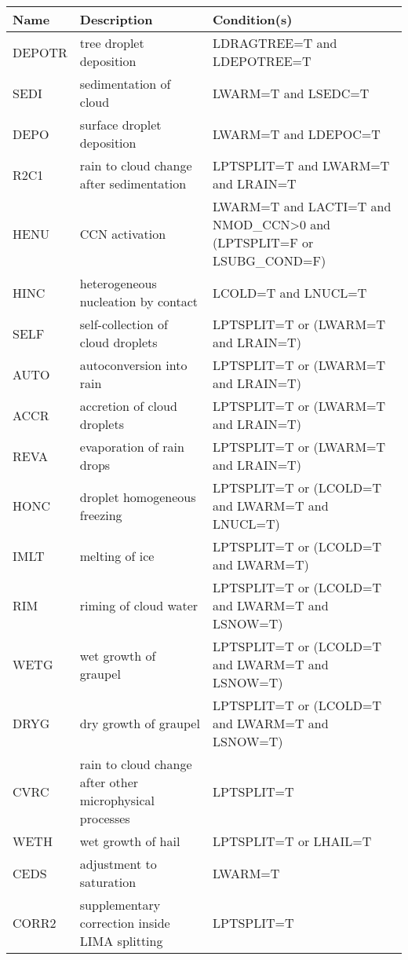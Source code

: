 \begin{longtable} {|p{}|p{}|p{}|}
\hline
Name & Description & Condition(s) \\
\hline \hline
\endhead
DEPOTR & tree droplet deposition                                  & LDRAGTREE=T and LDEPOTREE=T \\\hline
SEDI   & sedimentation of cloud                                   & LWARM=T and LSEDC=T \\\hline
DEPO   & surface droplet deposition                               & LWARM=T and LDEPOC=T \\\hline
R2C1   & rain to cloud change after sedimentation                 & LPTSPLIT=T and LWARM=T and LRAIN=T \\\hline
HENU   & CCN activation                                           & LWARM=T and LACTI=T and NMOD\_CCN>0 and (LPTSPLIT=F or LSUBG\_COND=F) \\\hline
HINC   & heterogeneous nucleation by contact                      & LCOLD=T and LNUCL=T \\\hline
SELF   & self-collection of cloud droplets                        & LPTSPLIT=T or (LWARM=T and LRAIN=T) \\\hline
AUTO   & autoconversion into rain                                 & LPTSPLIT=T or (LWARM=T and LRAIN=T) \\\hline
ACCR   & accretion of cloud droplets                              & LPTSPLIT=T or (LWARM=T and LRAIN=T) \\\hline
REVA   & evaporation of rain drops                                & LPTSPLIT=T or (LWARM=T and LRAIN=T) \\\hline
HONC   & droplet homogeneous freezing                             & LPTSPLIT=T or (LCOLD=T and LWARM=T and LNUCL=T) \\\hline
IMLT   & melting of ice                                           & LPTSPLIT=T or (LCOLD=T and LWARM=T) \\\hline
RIM    & riming of cloud water                                    & LPTSPLIT=T or (LCOLD=T and LWARM=T and LSNOW=T) \\\hline
WETG   & wet growth of graupel                                    & LPTSPLIT=T or (LCOLD=T and LWARM=T and LSNOW=T) \\\hline
DRYG   & dry growth of graupel                                    & LPTSPLIT=T or (LCOLD=T and LWARM=T and LSNOW=T) \\\hline
CVRC   & rain to cloud change after other microphysical processes & LPTSPLIT=T \\\hline
WETH   & wet growth of hail                                       & LPTSPLIT=T or LHAIL=T \\\hline
CEDS   & adjustment to saturation                                 & LWARM=T \\\hline
CORR2  & supplementary correction inside LIMA splitting           & LPTSPLIT=T \\\hline
\end{longtable}

